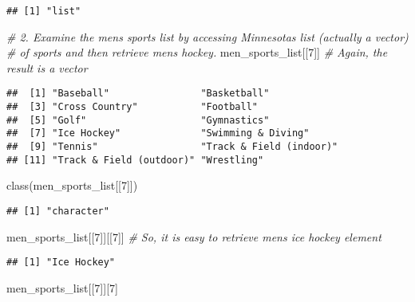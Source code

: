 \documentclass[
]{article}
\newenvironment{Shaded}{\begin{snugshade}}{\end{snugshade}}
\newcommand{\CommentTok}[1]{\textcolor[rgb]{0.56,0.35,0.01}{\textit{#1}}}
\newcommand{\DecValTok}[1]{\textcolor[rgb]{0.00,0.00,0.81}{#1}}
\newcommand{\FunctionTok}[1]{\textcolor[rgb]{0.00,0.00,0.00}{#1}}
\newcommand{\NormalTok}[1]{#1}
\begin{document}
\begin{verbatim}
## [1] "list"
\end{verbatim}

\begin{Shaded}
\begin{Highlighting}[]
\CommentTok{\# 2. Examine the men\textquotesingle{}s sports list by accessing Minnesota\textquotesingle{}s list (actually a vector) }
\CommentTok{\# of sports and then retrieve men\textquotesingle{}s hockey.}
\NormalTok{men\_sports\_list[[}\DecValTok{7}\NormalTok{]]     }\CommentTok{\# Again, the result is a vector}
\end{Highlighting}
\end{Shaded}

\begin{verbatim}
##  [1] "Baseball"                "Basketball"             
##  [3] "Cross Country"           "Football"               
##  [5] "Golf"                    "Gymnastics"             
##  [7] "Ice Hockey"              "Swimming & Diving"      
##  [9] "Tennis"                  "Track & Field (indoor)" 
## [11] "Track & Field (outdoor)" "Wrestling"
\end{verbatim}

\begin{Shaded}
\begin{Highlighting}[]
\FunctionTok{class}\NormalTok{(men\_sports\_list[[}\DecValTok{7}\NormalTok{]])    }
\end{Highlighting}
\end{Shaded}

\begin{verbatim}
## [1] "character"
\end{verbatim}

\begin{Shaded}
\begin{Highlighting}[]
\NormalTok{men\_sports\_list[[}\DecValTok{7}\NormalTok{]][[}\DecValTok{7}\NormalTok{]]  }\CommentTok{\# So, it is easy to retrieve men\textquotesingle{}s ice hockey element}
\end{Highlighting}
\end{Shaded}

\begin{verbatim}
## [1] "Ice Hockey"
\end{verbatim}

\begin{Shaded}
\begin{Highlighting}[]
\NormalTok{men\_sports\_list[[}\DecValTok{7}\NormalTok{]][}\DecValTok{7}\NormalTok{] }
\end{Highlighting}
\end{Shaded}
\end{document}
